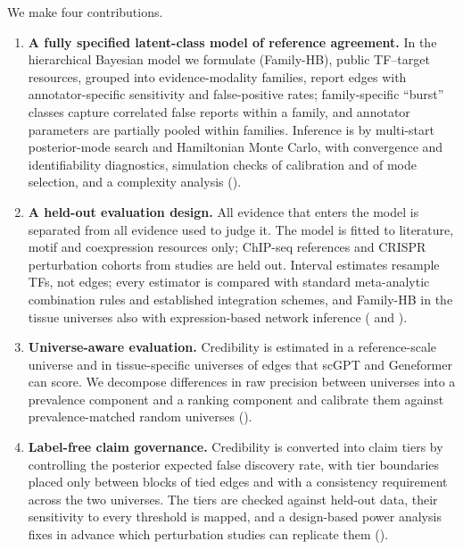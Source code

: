 We make four contributions.
\begin{enumerate}
  \item \textbf{A fully specified latent-class model of reference agreement.} In the hierarchical Bayesian model we formulate (Family-HB), \nNAnnotHeldin{} public TF--target resources, grouped into evidence-modality families, report edges with annotator-specific sensitivity and false-positive rates; family-specific ``burst'' classes capture correlated false reports within a family, and annotator parameters are partially pooled within families. Inference is by multi-start posterior-mode search and Hamiltonian Monte Carlo, with convergence and identifiability diagnostics, simulation checks of calibration and of mode selection, and a complexity analysis ().
  \item \textbf{A held-out evaluation design.} All evidence that enters the model is separated from all evidence used to judge it. The model is fitted to literature, motif and coexpression resources only; ChIP-seq references and \nCohN{} CRISPR perturbation cohorts from \nCohStudies{} studies are held out. Interval estimates resample TFs, not edges; every estimator is compared with standard meta-analytic combination rules and established integration schemes, and Family-HB in the tissue universes also with expression-based network inference ( and ).
  \item \textbf{Universe-aware evaluation.} Credibility is estimated in a reference-scale universe and in tissue-specific universes of edges that scGPT and Geneformer can score. We decompose differences in raw precision between universes into a prevalence component and a ranking component and calibrate them against prevalence-matched random universes ().
  \item \textbf{Label-free claim governance.} Credibility is converted into claim tiers by controlling the posterior expected false discovery rate, with tier boundaries placed only between blocks of tied edges and with a consistency requirement across the two universes. The tiers are checked against held-out data, their sensitivity to every threshold is mapped, and a design-based power analysis fixes in advance which perturbation studies can replicate them ().
\end{enumerate}


